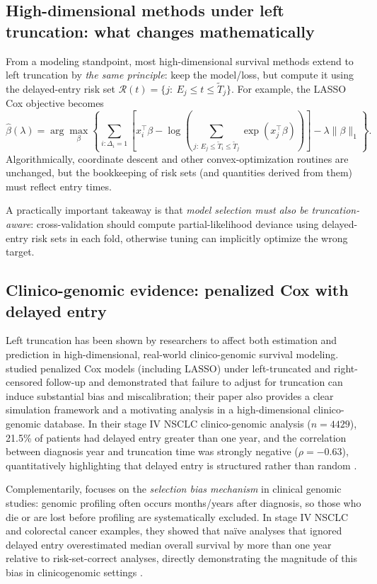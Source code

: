 \documentclass[11pt]{article}
\begin{document}
\subsection{High-dimensional methods under left truncation: what changes mathematically}\label{sec:lasso-cox-highdim}
From a modeling standpoint, most high-dimensional survival methods extend to left truncation by \emph{the same principle}: keep the model/loss, but compute it using the delayed-entry risk set \(\mathcal{R}(t)=\{j:\ E_j \le t \le \tilde T_j\}\).
For example, the LASSO Cox objective becomes
\begin{equation}
\hat\beta(\lambda)
=
\arg\max_{\beta}\left\{
\sum_{i:\Delta_i=1}\left[
x_i^\top\beta - \log\!\left(\sum_{j:\,E_j \le \tilde T_i \le \tilde T_j}\exp(x_j^\top\beta)\right)
\right]
-\lambda\|\beta\|_1
\right\}.
\label{eq:lasso_cox_left_trunc}
\end{equation}
Algorithmically, coordinate descent and other convex-optimization routines are unchanged, but the bookkeeping of risk sets (and quantities derived from them) must reflect entry times.

A practically important takeaway is that \emph{model selection must also be truncation-aware}: cross-validation should compute partial-likelihood deviance using delayed-entry risk sets in each fold, otherwise tuning can implicitly optimize the wrong target.

\subsection{Clinico-genomic evidence: penalized Cox with delayed entry}
Left truncation has been shown by researchers to affect both estimation and prediction in high-dimensional, real-world clinico-genomic survival modeling.
\citet{McGough2021} studied penalized Cox models (including LASSO) under left-truncated and right-censored follow-up and demonstrated that failure to adjust for truncation can induce substantial bias and miscalibration; their paper also provides a clear simulation framework and a motivating analysis in a high-dimensional clinico-genomic database. In their stage IV NSCLC clinico-genomic analysis (\(n=4429\)), 21.5\% of patients had delayed entry greater than one year, and the correlation between diagnosis year and truncation time was strongly negative (\(\rho=-0.63\)), quantitatively highlighting that delayed entry is structured rather than random \citep{McGough2021}.

Complementarily, \citet{Brown2022} focuses on the \emph{selection bias mechanism} in clinical genomic studies: genomic profiling often occurs months/years after diagnosis, so those who die or are lost before profiling are systematically excluded. In stage IV NSCLC and colorectal cancer examples, they showed that naïve analyses that ignored delayed entry overestimated median overall survival by more than one year relative to risk-set-correct analyses, directly demonstrating the magnitude of this bias in clinicogenomic settings \citep{Brown2022}.
\end{document}
